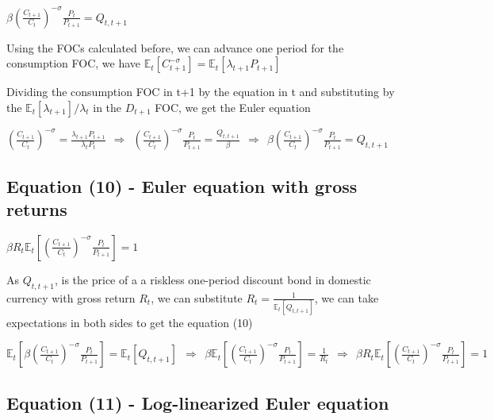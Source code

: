 \documentclass[
]{article}
\begin{document}
\(\displaystyle \beta \left( \frac{C_{t+1}}{C_t} \right)^{-\sigma} \frac{P_t}{P_{t+1}}= Q_{t,t+1}\)

\vspace{8pt}

Using the FOCs calculated before, we can advance one period for the
consumption FOC, we have
\(\mathbb{E}_t [C_{t+1}^{-\sigma}] = \mathbb{E}_t[\lambda_{t+1}P_{t+1}]\)

Dividing the consumption FOC in t+1 by the equation in t and
substituting by the \(\mathbb{E}_t[\lambda_{t+1}]/\lambda_t\) in the
\(D_{t+1}\) FOC, we get the Euler equation

\(\displaystyle \left( \frac{C_{t+1}}{C_t} \right)^{-\sigma} = \frac{\lambda_{t+1} P_{t+1}}{\lambda_t P_t} \ \ \Rightarrow \ \  \left( \frac{C_{t+1}}{C_t} \right)^{-\sigma} \frac{P_t}{P_{t+1}}= \frac{Q_{t,t+1}}{\beta} \ \ \Rightarrow \ \  \beta \left( \frac{C_{t+1}}{C_t} \right)^{-\sigma} \frac{P_t}{P_{t+1}}= Q_{t,t+1}\)

\vspace{12pt}

\hypertarget{equation-10---euler-equation-with-gross-returns}{%
\subsection{Equation (10) - Euler equation with gross
returns}\label{equation-10---euler-equation-with-gross-returns}}

\(\displaystyle \beta R_t \mathbb{E}_t \left[ \left( \frac{C_{t+1}}{C_t} \right)^{-\sigma} \frac{P_t}{P_{t+1}}\right]= 1\)

\vspace{8pt}

As \(Q_{t,t+1}\), is the price of a a riskless one-period discount bond
in domestic currency with gross return \(R_t\), we can substitute
\(\displaystyle R_t=\frac{1}{\mathbb{E}_t[Q_{t,t+1}]}\), we can take
expectations in both sides to get the equation (10)

\(\displaystyle \mathbb{E}_t \left[ \beta \left( \frac{C_{t+1}}{C_t} \right)^{-\sigma} \frac{P_t}{P_{t+1}}\right]= \mathbb{E}_t[Q_{t,t+1}] \ \ \Rightarrow \ \  \beta \mathbb{E}_t \left[ \left( \frac{C_{t+1}}{C_t} \right)^{-\sigma} \frac{P_t}{P_{t+1}}\right]= \frac{1}{R_t} \ \ \Rightarrow \ \  \beta R_t \mathbb{E}_t \left[ \left( \frac{C_{t+1}}{C_t} \right)^{-\sigma} \frac{P_t}{P_{t+1}}\right]= 1\)

\vspace{12pt}

\hypertarget{equation-11---log-linearized-euler-equation}{%
\subsection{Equation (11) - Log-linearized Euler
equation}\label{equation-11---log-linearized-euler-equation}}
\end{document}
